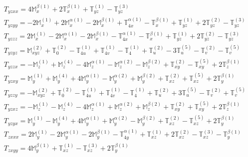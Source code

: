 \documentclass[fleqn,8pt,landscape]{jsarticle}
\begin{document}
\begin{align*}
& T_{yzxx} = 4 \mathbb{M}_{x}^{\beta(1)} + 2 \mathbb{T}_{x}^{\beta(1)} + \mathbb{T}_{yz}^{(1)} - \mathbb{T}_{yz}^{(3)} \\
& T_{yzyy} = - 2 \mathbb{M}_{x}^{(1)} + 2 \mathbb{M}_{x}^{\alpha(1)} - 2 \mathbb{M}_{x}^{\beta(1)} + \mathbb{T}_{4x}^{\alpha(1)} - \mathbb{T}_{x}^{\beta(1)} + \mathbb{T}_{yz}^{(1)} + 2 \mathbb{T}_{yz}^{(2)} - \mathbb{T}_{yz}^{(3)} \\
& T_{yzzz} = 2 \mathbb{M}_{x}^{(1)} - 2 \mathbb{M}_{x}^{\alpha(1)} - 2 \mathbb{M}_{x}^{\beta(1)} - \mathbb{T}_{4x}^{\alpha(1)} - \mathbb{T}_{x}^{\beta(1)} + \mathbb{T}_{yz}^{(1)} + 2 \mathbb{T}_{yz}^{(2)} - \mathbb{T}_{yz}^{(3)} \\
& T_{yzyz} = \mathbb{M}_{xyz}^{(2)} + \mathbb{T}_{0}^{(2)} - \mathbb{T}_{4u}^{(1)} + \mathbb{T}_{4v}^{(1)} - \mathbb{T}_{4}^{(1)} + \mathbb{T}_{u}^{(2)} - 3 \mathbb{T}_{u}^{(5)} - \mathbb{T}_{v}^{(2)} - \mathbb{T}_{v}^{(5)} \\
& T_{yzzx} = - \mathbb{M}_{z}^{(1)} + \mathbb{M}_{z}^{(4)} - 4 \mathbb{M}_{z}^{\alpha(1)} - \mathbb{M}_{z}^{\alpha(2)} - \mathbb{M}_{z}^{\beta(2)} + \mathbb{T}_{xy}^{(2)} - \mathbb{T}_{xy}^{(5)} + 2 \mathbb{T}_{z}^{\beta(1)} \\
& T_{yzxy} = \mathbb{M}_{y}^{(1)} + \mathbb{M}_{y}^{(4)} + 4 \mathbb{M}_{y}^{\alpha(1)} - \mathbb{M}_{y}^{\alpha(2)} + \mathbb{M}_{y}^{\beta(2)} + \mathbb{T}_{xz}^{(2)} + \mathbb{T}_{xz}^{(5)} + 2 \mathbb{T}_{y}^{\beta(1)} \\
& T_{yzzy} = - \mathbb{M}_{xyz}^{(2)} + \mathbb{T}_{0}^{(2)} - \mathbb{T}_{4u}^{(1)} + \mathbb{T}_{4v}^{(1)} - \mathbb{T}_{4}^{(1)} + \mathbb{T}_{u}^{(2)} + 3 \mathbb{T}_{u}^{(5)} - \mathbb{T}_{v}^{(2)} + \mathbb{T}_{v}^{(5)} \\
& T_{yzxz} = - \mathbb{M}_{z}^{(1)} - \mathbb{M}_{z}^{(4)} - 4 \mathbb{M}_{z}^{\alpha(1)} + \mathbb{M}_{z}^{\alpha(2)} + \mathbb{M}_{z}^{\beta(2)} + \mathbb{T}_{xy}^{(2)} + \mathbb{T}_{xy}^{(5)} + 2 \mathbb{T}_{z}^{\beta(1)} \\
& T_{yzyx} = \mathbb{M}_{y}^{(1)} - \mathbb{M}_{y}^{(4)} + 4 \mathbb{M}_{y}^{\alpha(1)} + \mathbb{M}_{y}^{\alpha(2)} - \mathbb{M}_{y}^{\beta(2)} + \mathbb{T}_{xz}^{(2)} - \mathbb{T}_{xz}^{(5)} + 2 \mathbb{T}_{y}^{\beta(1)} \\
& T_{zxxx} = 2 \mathbb{M}_{y}^{(1)} - 2 \mathbb{M}_{y}^{\alpha(1)} - 2 \mathbb{M}_{y}^{\beta(1)} - \mathbb{T}_{4y}^{\alpha(1)} + \mathbb{T}_{xz}^{(1)} + 2 \mathbb{T}_{xz}^{(2)} - \mathbb{T}_{xz}^{(3)} - \mathbb{T}_{y}^{\beta(1)} \\
& T_{zxyy} = 4 \mathbb{M}_{y}^{\beta(1)} + \mathbb{T}_{xz}^{(1)} - \mathbb{T}_{xz}^{(3)} + 2 \mathbb{T}_{y}^{\beta(1)} \\

\end{align*}
\end{document}
